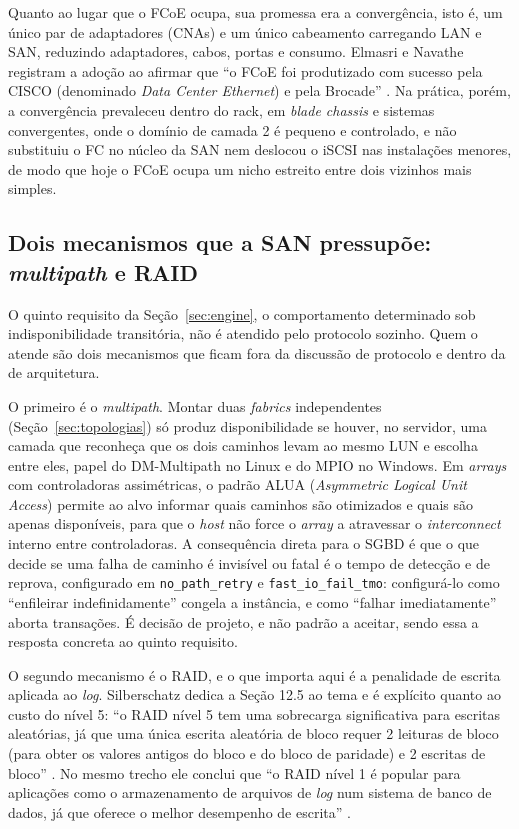 \documentclass[11pt,a4paper]{article}
\begin{document}
Quanto ao lugar que o FCoE ocupa, sua promessa era a convergência, isto é, um único par de
adaptadores (CNAs) e um único cabeamento carregando LAN e SAN, reduzindo adaptadores, cabos, portas
e consumo. Elmasri e Navathe registram a adoção ao afirmar que ``o FCoE foi produtizado com sucesso
pela CISCO (denominado \textit{Data Center Ethernet}) e pela Brocade'' \cite{elmasri2018}. Na
prática, porém, a convergência prevaleceu dentro do rack, em \textit{blade chassis} e sistemas
convergentes, onde o domínio de camada 2 é pequeno e controlado, e não substituiu o FC no núcleo da
SAN nem deslocou o iSCSI nas instalações menores, de modo que hoje o FCoE ocupa um nicho estreito
entre dois vizinhos mais simples.

\subsection{Dois mecanismos que a SAN pressupõe: \textit{multipath} e RAID}
\label{sec:multipath}

O quinto requisito da Seção~\ref{sec:engine}, o comportamento determinado sob indisponibilidade
transitória, não é atendido pelo protocolo sozinho. Quem o atende são dois mecanismos que ficam fora
da discussão de protocolo e dentro da de arquitetura.

O primeiro é o \textit{multipath}. Montar duas \textit{fabrics} independentes
(Seção~\ref{sec:topologias}) só produz disponibilidade se houver, no servidor, uma camada que
reconheça que os dois caminhos levam ao mesmo LUN e escolha entre eles, papel do DM-Multipath no
Linux e do MPIO no Windows. Em \textit{arrays} com controladoras assimétricas, o padrão ALUA
(\textit{Asymmetric Logical Unit Access}) permite ao alvo informar quais caminhos são otimizados e
quais são apenas disponíveis, para que o \textit{host} não force o \textit{array} a atravessar o
\textit{interconnect} interno entre controladoras. A consequência direta para o SGBD é que o que
decide se uma falha de caminho é invisível ou fatal é o tempo de detecção e de reprova, configurado
em \texttt{no\_path\_retry} e \texttt{fast\_io\_fail\_tmo}: configurá-lo como ``enfileirar
indefinidamente'' congela a instância, e como ``falhar imediatamente'' aborta transações. É decisão
de projeto, e não padrão a aceitar, sendo essa a resposta concreta ao quinto requisito.

O segundo mecanismo é o RAID, e o que importa aqui é a penalidade de escrita aplicada ao \textit{log}.
Silberschatz dedica a Seção 12.5 ao tema e é explícito quanto ao custo do nível 5: ``o RAID nível 5
tem uma sobrecarga significativa para escritas aleatórias, já que uma única escrita aleatória de
bloco requer 2 leituras de bloco (para obter os valores antigos do bloco e do bloco de paridade) e 2
escritas de bloco'' \cite{silberschatz2020}. No mesmo trecho ele conclui que ``o RAID nível 1 é
popular para aplicações como o armazenamento de arquivos de \textit{log} num sistema de banco de
dados, já que oferece o melhor desempenho de escrita'' \cite{silberschatz2020}.
\end{document}
